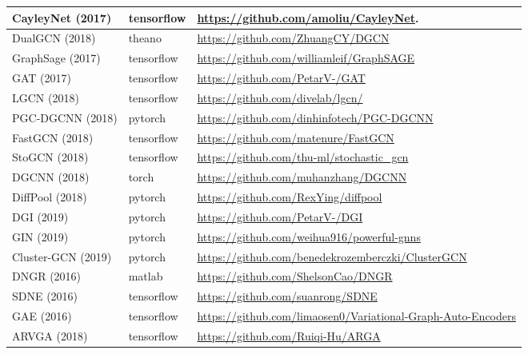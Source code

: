 \begin{table}
\begin{tabular}{ l l l }
		CayleyNet (2017) & tensorflow & \url{https://github.com/amoliu/CayleyNet}.  \\ \hline 
		DualGCN (2018)  & theano & \url{https://github.com/ZhuangCY/DGCN} \\ \hline
		GraphSage (2017)     &  tensorflow           &        \url{https://github.com/williamleif/GraphSAGE}     \\ \hline
		GAT (2017)          &     tensorflow        &    \url{https://github.com/PetarV-/GAT}         \\ \hline 
		LGCN (2018)         &    tensorflow         &      \url{https://github.com/divelab/lgcn/}       \\ \hline
		PGC-DGCNN (2018) & pytorch & \url{https://github.com/dinhinfotech/PGC-DGCNN} \\ \hline
		FastGCN (2018)  & tensorflow & \url{https://github.com/matenure/FastGCN} \\ \hline
		StoGCN (2018)  & tensorflow & \url{https://github.com/thu-ml/stochastic_gcn} \\ \hline
		DGCNN (2018)  & torch & \url{https://github.com/muhanzhang/DGCNN} \\ \hline
		DiffPool (2018)  & pytorch & \url{https://github.com/RexYing/diffpool} \\ \hline
		DGI (2019)  & pytorch & \url{https://github.com/PetarV-/DGI} \\ \hline
		GIN (2019)  & pytorch & \url{https://github.com/weihua916/powerful-gnns} \\ \hline
		Cluster-GCN (2019)  & pytorch & \url{https://github.com/benedekrozemberczki/ClusterGCN} \\ \hline
		DNGR (2016)        &      matlab       & \url{https://github.com/ShelsonCao/DNGR}            \\ \hline 
		SDNE (2016)      & tensorflow            &    \url{https://github.com/suanrong/SDNE}         \\ \hline 
		GAE (2016)        &  tensorflow           &    \url{https://github.com/limaosen0/Variational-Graph-Auto-Encoders}         \\ \hline 
		ARVGA (2018)          &  tensorflow           &    \url{https://github.com/Ruiqi-Hu/ARGA}         \\ \hline 

\end{tabular}
\end{table}
